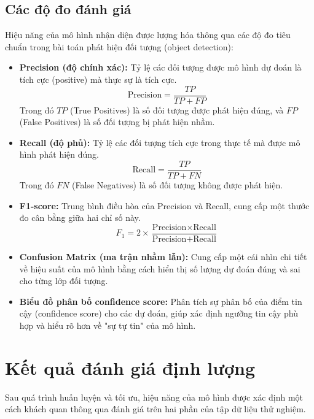 \subsection{Các độ đo đánh giá}
\label{ssec:metrics_danh_gia}
Hiệu năng của mô hình nhận diện được lượng hóa thông qua các độ đo tiêu chuẩn trong bài toán phát hiện đối tượng (object detection):
\begin{itemize}
    \item \textbf{Precision (độ chính xác):} Tỷ lệ các đối tượng được mô hình dự đoán là tích cực (positive) mà thực sự là tích cực.
    \begin{equation}
        \text{Precision} = \frac{TP}{TP + FP}
    \end{equation}
    Trong đó $TP$ (True Positives) là số đối tượng được phát hiện đúng, và $FP$ (False Positives) là số đối tượng bị phát hiện nhầm.
    \item \textbf{Recall (độ phủ):} Tỷ lệ các đối tượng tích cực trong thực tế mà được mô hình phát hiện đúng.
    \begin{equation}
        \text{Recall} = \frac{TP}{TP + FN}
    \end{equation}
    Trong đó $FN$ (False Negatives) là số đối tượng không được phát hiện.
    \item \textbf{F1-score:} Trung bình điều hòa của Precision và Recall, cung cấp một thước đo cân bằng giữa hai chỉ số này.
    \begin{equation}
        F_1 = 2 \times \frac{\text{Precision} \times \text{Recall}}{\text{Precision} + \text{Recall}}
    \end{equation}

    \item \textbf{Confusion Matrix (ma trận nhầm lẫn):} Cung cấp một cái nhìn chi tiết về hiệu suất của mô hình bằng cách hiển thị số lượng dự đoán đúng và sai cho từng lớp đối tượng.
    \item \textbf{Biểu đồ phân bố confidence score:} Phân tích sự phân bố của điểm tin cậy (confidence score) cho các dự đoán, giúp xác định ngưỡng tin cậy phù hợp và hiểu rõ hơn về "sự tự tin" của mô hình.
\end{itemize}
\section{Kết quả đánh giá định lượng}
\label{ssec:ket_qua_dinh_luong}

Sau quá trình huấn luyện và tối ưu, hiệu năng của mô hình được xác định một cách khách quan thông qua đánh giá trên hai phần của tập dữ liệu thử nghiệm.

